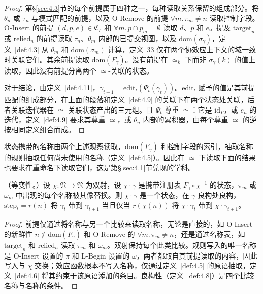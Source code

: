 \begin{proof}
第\S\ref{sec:4.3}节的每个前提属于四种之一，每种读取关系保留的组成部分。将 $\theta_n$ 或 $\tau_n$ 与模式匹配的前提，以及 O-Remove 的前提 $\forall m.\, \pi_m \neq n$ 读取控制字段。O-Insert 的前提 $(d, p, e) \in \mathfrak{C}_\Gamma$ 和 $\forall m.\, p \cap p_m = \emptyset$ 读取 $d$、$p$ 和 $e$。提及 $\mathrm{target}_n$ 或 $\mathrm{relied}_n$ 的前提读取 $\tau_n$、$\theta_m$ 内部的已提交视图，以及 $\mathrm{dom}(\sigma_\gamma)$，定义~\ref{def:4.3} 从 $\theta_m$ 和 $\mathrm{dom}(\sigma_m)$ 计算，定义~33 仅在两个协效应上下文的域一致时关联它们。其余前提读取 $\mathrm{dom}(F_\gamma)$。没有前提在 $\simeq_k$ 下而非 $\sigma_\gamma(k)$ 的值上读取，因此没有前提分离两个 $\simeq$-关联的状态。

对于结论，由定义~\ref{def:4.11}，$\gamma_{t+1} = \mathrm{edit}_t(\Psi_t(\gamma_t))$。$\mathrm{edit}_t$ 赋予的值是其前提匹配的组成部分，在上面的段落和定义~\ref{def:4.9} 的关联下在两个状态处关联，后者关联迭代器在 $\simeq$-关联状态产出的三元组。且 $\Psi_t$ 尊重 $\simeq$：它是 $\mathrm{id}_\Gamma$，或 $e_n$ 的迭代，定义~\ref{def:4.9} 要求其尊重 $\simeq$，或 $\theta_n$ 内部的累积器，由每个尊重 $\simeq$ 的逆按相同定义组合而成。
\end{proof}

状态携带的名称由两个上述观察读取，$\mathrm{dom}(F_\gamma)$ 和控制字段的索引，抽取名称的规则抽取任何尚未使用的名称（定义~\ref{def:4.5}）。因此在 $\simeq$ 下读取下面的结果也要求在重命名下读取它们，这是第\S\ref{sec:4.1}节兑现的学科。

\begin{lemma}\label{lem:4.3}
（等变性。）设 $\chi: \mathfrak{N} \to \mathfrak{N}$ 为双射，设 $\chi \cdot \gamma$ 是携带注册表 $F_\gamma \circ \chi^{-1}$ 的状态，$\pi_m$ 或 $\omega_m$ 中出现的每个名称被其像替换。则 $\chi \cdot \gamma$ 是一个状态，在 $\gamma$ 良构处良构，$\mathrm{step}_t = r(n)$ 将 $\gamma_t$ 带到 $\gamma_{t+1}$ 当且仅当 $r(\chi(n))$ 将 $\chi \cdot \gamma_t$ 带到 $\chi \cdot \gamma_{t+1}$。
\end{lemma}

\begin{proof}
前提仅通过将名称与另一个比较来读取名称，无论是直接的，如 O-Insert 的新鲜性 $n \notin \mathrm{dom}(F_\gamma)$ 和 O-Remove 的 $\forall m.\, \pi_m \neq n$，还是通过名称表，如 $\mathrm{target}_n$ 和 $\mathrm{relied}_n$ 读取 $\pi_m$ 和 $\omega_m$。双射保持每个此类比较。规则写入的唯一名称是 O-Insert 设置的 $\pi$ 和 L-Begin 设置的 $\omega$，两者都取自其前提读取的内容，因此写入与 $\chi$ 交换；效应函数根本不写入名称，仅通过定义~\ref{def:4.5} 的原语抽取，定义~\ref{def:4.6} 将其约束于该原语添加的条目。良构性（定义~\ref{def:4.8}）是四个比较名称与名称的条件。
\end{proof}

